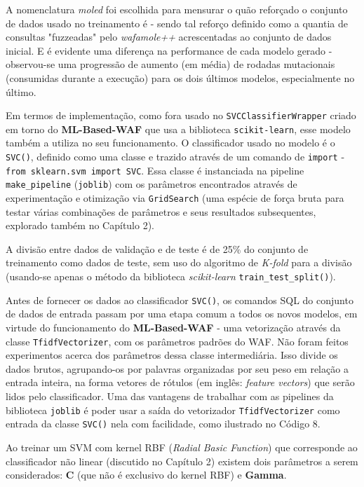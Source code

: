 A nomenclatura \textit{moled} foi escolhida para mensurar o quão reforçado o conjunto de dados usado no treinamento é - sendo tal reforço definido como a quantia de consultas "fuzzeadas" pelo \textit{wafamole++} acrescentadas ao conjunto de dados inicial. E é evidente uma diferença na performance de cada modelo gerado - observou-se uma progressão de aumento (em média) de rodadas mutacionais (consumidas durante a execução) para os dois últimos modelos, especialmente no último.

Em termos de implementação, como fora usado no \verb+SVCClassifierWrapper+ criado em torno do \textbf{ML-Based-WAF} que usa a biblioteca \verb+scikit-learn+, esse modelo também a utiliza no seu funcionamento. O classificador usado no modelo é o \verb+SVC()+, definido como uma classe e trazido através de um comando de \verb+import+ - \verb+from sklearn.svm import SVC+. Essa classe é instanciada na pipeline \verb+make_pipeline+ (\verb+joblib+) com os parâmetros encontrados através de experimentação e otimização via \verb+GridSearch+ (uma espécie de força bruta para testar várias combinações de parâmetros e seus resultados subsequentes, explorado também no Capítulo 2). 

A divisão entre dados de validação e de teste é de 25\% do conjunto de treinamento como dados de teste, sem uso do algoritmo de \textit{K-fold} para a divisão (usando-se apenas o método da biblioteca \textit{scikit-learn} \verb+train_test_split()+).

Antes de fornecer os dados ao classificador \verb+SVC()+, os comandos SQL do conjunto de dados de entrada passam por uma etapa comum a todos os novos modelos, em virtude do funcionamento do \textbf{ML-Based-WAF} - uma vetorização através da classe \verb+TfidfVectorizer+, com os parâmetros padrões do WAF. Não foram feitos experimentos acerca dos parâmetros dessa classe intermediária. Isso divide os dados brutos, agrupando-os por palavras organizadas por seu peso em relação a entrada inteira, na forma vetores de rótulos (em inglês: \textit{feature vectors}) que serão lidos pelo classificador. Uma das vantagens de trabalhar com as pipelines da biblioteca \verb+joblib+ é poder usar a saída do vetorizador \verb+TfidfVectorizer+ como entrada da classe \verb+SVC()+ nela com facilidade, como ilustrado no Código 8.

Ao treinar um SVM com kernel RBF (\textit{Radial Basic Function}) que corresponde ao classificador não linear (discutido no Capítulo 2) existem dois parâmetros a serem considerados: \textbf{C} (que não é exclusivo do kernel RBF) e \textbf{Gamma}.

